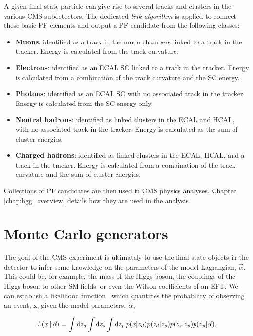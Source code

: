 A given final-state particle can give rise to several tracks and clusters in the various CMS subdetectors. The dedicated \textit{link algorithm} is applied to connect these basic PF elements and output a PF candidate from the following classes:
\begin{itemize}
    \item \textbf{Muons}: identified as a track in the muon chambers linked to a track in the tracker. Energy is calculated from the track curvature.
    \item \textbf{Electrons}: identified as an ECAL SC linked to a track in the tracker. Energy is calculated from a combination of the track curvature and the SC energy. 
    \item \textbf{Photons}: identified as an ECAL SC with no associated track in the tracker. Energy is calculated from the SC energy only.
    \item \textbf{Neutral hadrons}: identified as linked clusters in the ECAL and HCAL, with no associated track in the tracker. Energy is calculated as the sum of cluster energies.
    \item \textbf{Charged hadrons}: identified as linked clusters in the ECAL, HCAL, and a track in the tracker. Energy is calculated from a combination of the track curvature and the sum of cluster energies.
\end{itemize}
\noindent
Collections of PF candidates are then used in CMS physics analyses. Chapter \ref{chap:hgg_overview} details how they are used in the \Hgg analysis

\section{Monte Carlo generators}\label{sec:mc}
The goal of the CMS experiment is ultimately to use the final state objects in the detector to infer some knowledge on the parameters of the model Lagrangian, $\vec{\alpha}$. This could be, for example, the mass of the Higgs boson, the couplings of the Higgs boson to other SM fields, or even the Wilson coefficients of an EFT. We can establish a likelihood function~\cite{} which quantifies the probability of observing an event, x, given the model parameters, $\vec{\alpha}$,

\begin{equation}\label{eq:mc_integral}
    L(x\,|\,\vec{\alpha}) = \int {\rm{d}}z_d \int {\rm{d}}z_s \int {\rm{d}}z_p \, p(x|z_d)p(z_d|z_s)p(z_s|z_p)p(z_p|\vec{\alpha}),
\end{equation}


